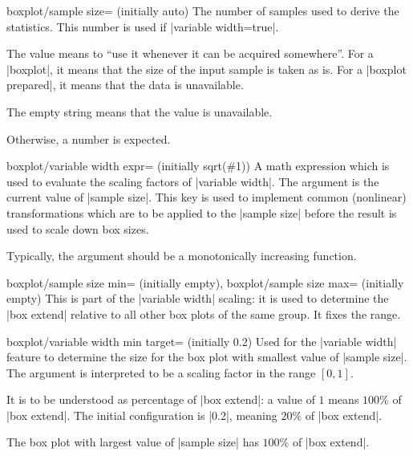 \begin{pgfplotskey}{boxplot/sample size= (initially auto)}
    The number of samples used to derive the statistics. This number is used if
    |variable width=true|.

    The value  means to ``use it whenever it can be acquired
    somewhere''. For a |boxplot|, it means that the size of the input sample is
    taken as is. For a |boxplot prepared|, it means that the data is
    unavailable.

    The empty string means that the value is unavailable.

    Otherwise, a number is expected.
\end{pgfplotskey}

\begin{pgfplotskey}{boxplot/variable width expr= (initially {sqrt(\#1)})}
    A math expression which is used to evaluate the scaling factors of
    |variable width|. The argument is the current value of |sample size|. This
    key is used to implement common (nonlinear) transformations which are to be
    applied to the |sample size| before the result is used to scale down box
    sizes.

    Typically, the argument should be a monotonically increasing function.
\end{pgfplotskey}

\begin{pgfplotskeylist}{%
    boxplot/sample size min= (initially empty),
    boxplot/sample size max= (initially empty)%
}
    This is part of the |variable width| scaling: it is used to determine the
    |box extend| relative to all other box plots of the same group. It fixes
    the range.
\end{pgfplotskeylist}

\begin{pgfplotskey}{%
    boxplot/variable width min target= (initially 0.2)%
}
    Used for the |variable width| feature to determine the size for the box
    plot with smallest value of |sample size|. The argument is interpreted to
    be a scaling factor in the range $[0,1]$.

    It is to be understood as percentage of |box extend|: a value of $1$ means
    $100\%$ of |box extend|. The initial configuration is |0.2|, meaning $20\%$
    of |box extend|.

    The box plot with largest value of |sample size| has $100\%$ of
    |box extend|.
\end{pgfplotskey}

